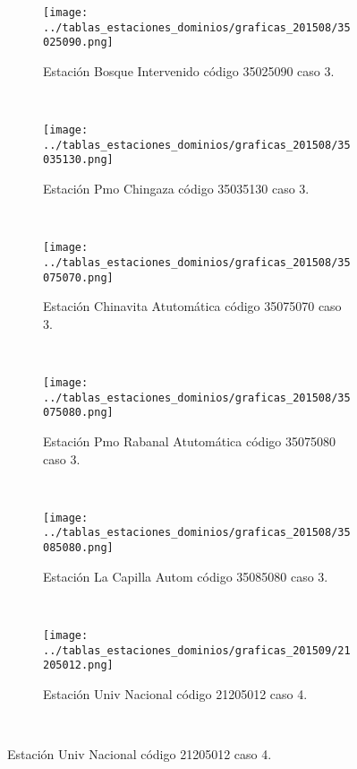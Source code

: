 \begin{figure}[H]\ContinuedFloat
\centering
\begin{subfigure}[normla]{0.4\textwidth}
\texttt{[image: ../tablas\_estaciones\_dominios/graficas\_201508/35025090.png]}
\caption{Estación Bosque Intervenido código 35025090 caso 3.}
\end{subfigure}
~
\begin{subfigure}[normla]{0.4\textwidth}
\texttt{[image: ../tablas\_estaciones\_dominios/graficas\_201508/35035130.png]}
\caption{Estación Pmo Chingaza código 35035130 caso 3.}
\end{subfigure}
~
\begin{subfigure}[normla]{0.4\textwidth}
\texttt{[image: ../tablas\_estaciones\_dominios/graficas\_201508/35075070.png]}
\caption{Estación Chinavita Atutomática código 35075070 caso 3.}
\end{subfigure}
~
\begin{subfigure}[normla]{0.4\textwidth}
\texttt{[image: ../tablas\_estaciones\_dominios/graficas\_201508/35075080.png]}
\caption{Estación Pmo Rabanal Atutomática código 35075080 caso 3.}
\end{subfigure}
~
\begin{subfigure}[normla]{0.4\textwidth}
\texttt{[image: ../tablas\_estaciones\_dominios/graficas\_201508/35085080.png]}
\caption{Estación La Capilla Autom código 35085080 caso 3.}
\end{subfigure}
~
\begin{subfigure}[normla]{0.4\textwidth}
\texttt{[image: ../tablas\_estaciones\_dominios/graficas\_201509/21205012.png]}
\caption{Estación Univ Nacional código 21205012 caso 4.}
\end{subfigure}
~
\end{figure}
 
